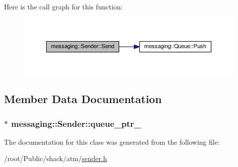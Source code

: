 Here is the call graph for this function\-:\nopagebreak
\begin{figure}[H]
\begin{center}
\leavevmode
\includegraphics[width=350pt]{classmessaging_1_1Sender_a5f8d8f2fa560996d8f224cc0f10d8f8c_cgraph}
\end{center}
\end{figure}




\subsection{Member Data Documentation}
\hypertarget{classmessaging_1_1Sender_a56aa7e425615eae331039cd66346b56c}{
\subsubsection[{queue\-\_\-ptr\-\_\-}]{$\ast$ messaging\-::\-Sender\-::queue\-\_\-ptr\-\_\-\hspace{0.3cm}{\ttfamily [private]}}}\label{classmessaging_1_1Sender_a56aa7e425615eae331039cd66346b56c}


The documentation for this class was generated from the following file\-:\begin{DoxyCompactItemize}
\item 
/root/\-Public/shack/atm/\hyperlink{sender_8h}{sender.\-h}\end{DoxyCompactItemize}
